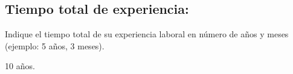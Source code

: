 \subsection{Tiempo total de experiencia:}
\begin{instrucciones}
  Indique el tiempo total de su experiencia laboral en número de años
  y meses (ejemplo: 5 años, 3 meses).
\end{instrucciones}
10 años.

